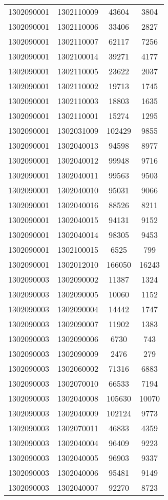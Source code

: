 \begin{longtable}{llcc}
1302090001 & 1302110009 & 43604 & 3804\\
1302090001 & 1302110006 & 33406 & 2827\\
1302090001 & 1302110007 & 62117 & 7256\\
1302090001 & 1302100014 & 39271 & 4177\\
1302090001 & 1302110005 & 23622 & 2037\\
1302090001 & 1302110002 & 19713 & 1745\\
1302090001 & 1302110003 & 18803 & 1635\\
1302090001 & 1302110001 & 15274 & 1295\\
1302090001 & 1302031009 & 102429 & 9855\\
1302090001 & 1302040013 & 94598 & 8977\\
1302090001 & 1302040012 & 99948 & 9716\\
1302090001 & 1302040011 & 99563 & 9503\\
1302090001 & 1302040010 & 95031 & 9066\\
1302090001 & 1302040016 & 88526 & 8211\\
1302090001 & 1302040015 & 94131 & 9152\\
1302090001 & 1302040014 & 98305 & 9453\\
1302090001 & 1302100015 & 6525 & 799\\
1302090001 & 1302012010 & 166050 & 16243\\
1302090003 & 1302090002 & 11387 & 1324\\
1302090003 & 1302090005 & 10060 & 1152\\
1302090003 & 1302090004 & 14442 & 1747\\
1302090003 & 1302090007 & 11902 & 1383\\
1302090003 & 1302090006 & 6730 & 743\\
1302090003 & 1302090009 & 2476 & 279\\
1302090003 & 1302060002 & 71316 & 6883\\
1302090003 & 1302070010 & 66533 & 7194\\
1302090003 & 1302040008 & 105630 & 10070\\
1302090003 & 1302040009 & 102124 & 9773\\
1302090003 & 1302070011 & 46833 & 4359\\
1302090003 & 1302040004 & 96409 & 9223\\
1302090003 & 1302040005 & 96903 & 9337\\
1302090003 & 1302040006 & 95481 & 9149\\
1302090003 & 1302040007 & 92270 & 8723\\

\end{longtable}

